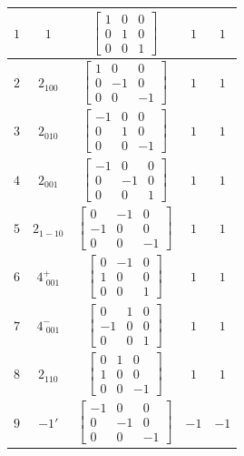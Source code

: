 \documentclass[fleqn,8pt]{jsarticle}
\begin{document}
\begin{longtable}{ccccc}
$ 1 $ & $ 1 $ & $ \begin{bmatrix} 1 & 0 & 0 \\ 0 & 1 & 0 \\ 0 & 0 & 1 \end{bmatrix} $ & $ 1 $ & $ 1 $ \\ \hline
$ 2 $ & $ 2{}_{100} $ & $ \begin{bmatrix} 1 & 0 & 0 \\ 0 & -1 & 0 \\ 0 & 0 & -1 \end{bmatrix} $ & $ 1 $ & $ 1 $ \\ \hline
$ 3 $ & $ 2{}_{010} $ & $ \begin{bmatrix} -1 & 0 & 0 \\ 0 & 1 & 0 \\ 0 & 0 & -1 \end{bmatrix} $ & $ 1 $ & $ 1 $ \\ \hline
$ 4 $ & $ 2{}_{001} $ & $ \begin{bmatrix} -1 & 0 & 0 \\ 0 & -1 & 0 \\ 0 & 0 & 1 \end{bmatrix} $ & $ 1 $ & $ 1 $ \\ \hline
$ 5 $ & $ 2{}_{1-10} $ & $ \begin{bmatrix} 0 & -1 & 0 \\ -1 & 0 & 0 \\ 0 & 0 & -1 \end{bmatrix} $ & $ 1 $ & $ 1 $ \\ \hline
$ 6 $ & $ 4^{+}_{\,\,001} $ & $ \begin{bmatrix} 0 & -1 & 0 \\ 1 & 0 & 0 \\ 0 & 0 & 1 \end{bmatrix} $ & $ 1 $ & $ 1 $ \\ \hline
$ 7 $ & $ 4^{-}_{\,\,001} $ & $ \begin{bmatrix} 0 & 1 & 0 \\ -1 & 0 & 0 \\ 0 & 0 & 1 \end{bmatrix} $ & $ 1 $ & $ 1 $ \\ \hline
$ 8 $ & $ 2{}_{110} $ & $ \begin{bmatrix} 0 & 1 & 0 \\ 1 & 0 & 0 \\ 0 & 0 & -1 \end{bmatrix} $ & $ 1 $ & $ 1 $ \\ \hline
$ 9 $ & $ -1{}' $ & $ \begin{bmatrix} -1 & 0 & 0 \\ 0 & -1 & 0 \\ 0 & 0 & -1 \end{bmatrix} $ & $ -1 $ & $ -1 $ \\ \hline

\end{longtable}
\end{document}
